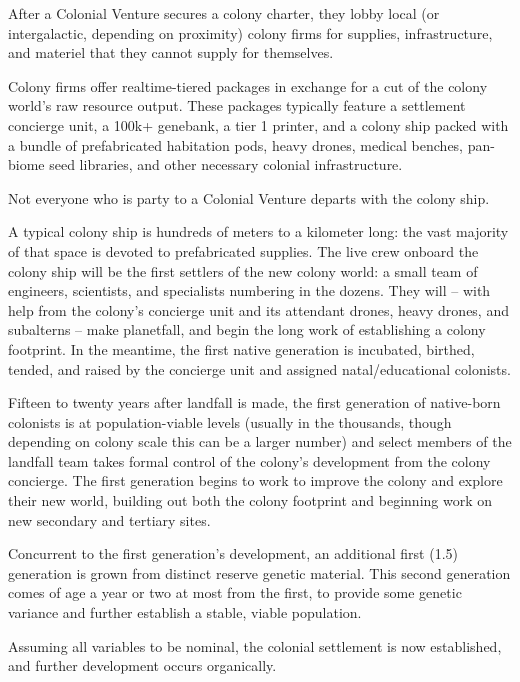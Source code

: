 After a Colonial Venture secures a colony charter, they lobby local (or intergalactic, depending on
proximity) colony firms for supplies, infrastructure, and materiel that they cannot supply for
themselves.


Colony firms offer realtime-tiered packages in exchange for a cut of the colony world’s raw
resource output. These packages typically feature a settlement concierge unit, a 100k+
genebank, a tier 1 printer, and a colony ship packed with a bundle of prefabricated habitation
pods, heavy drones, medical benches, pan-biome seed libraries, and other necessary colonial
infrastructure.


Not everyone who is party to a Colonial Venture departs with the colony ship.


A typical colony ship is hundreds of meters to a kilometer long: the vast majority of that space is
devoted to prefabricated supplies. The live crew onboard the colony ship will be the first settlers
of the new colony world: a small team of engineers, scientists, and specialists numbering in the
dozens. They will -- with help from the colony’s concierge unit and its attendant drones, heavy
drones, and subalterns -- make planetfall, and begin the long work of establishing a colony
footprint. In the meantime, the first native generation is incubated, birthed, tended, and raised by
the concierge unit and assigned natal/educational colonists.


Fifteen to twenty years after landfall is made, the first generation of native-born colonists is at
population-viable levels (usually in the thousands, though depending on colony scale this can be
a larger number) and select members of the landfall team takes formal control of the colony’s
development from the colony concierge. The first generation begins to work to improve the
colony and explore their new world, building out both the colony footprint and beginning work on
new secondary and tertiary sites.


Concurrent to the first generation’s development, an additional first (1.5) generation is grown
from distinct reserve genetic material. This second generation comes of age a year or two at
most from the first, to provide some genetic variance and further establish a stable, viable
population.





Assuming all variables to be nominal, the colonial settlement is now established, and further
development occurs organically.

